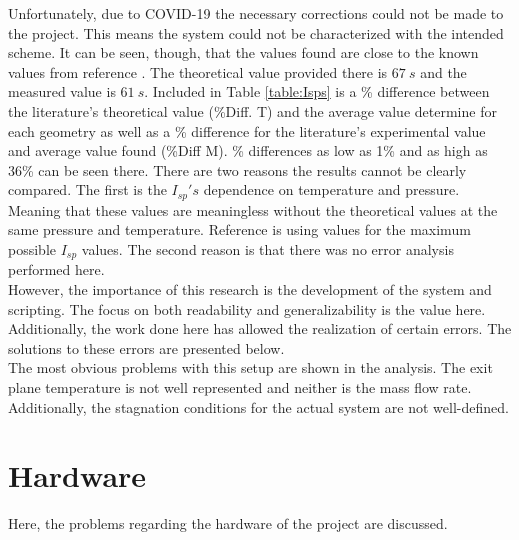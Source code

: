 Unfortunately, due to COVID-19 the necessary corrections could not be made to the project. This means the system could not be characterized with the intended scheme. It can be seen, though, that the values found are close to the known values from reference \cite{anis}. The theoretical value provided there is $67\ s$ and the measured value is $61\ s$. Included in Table \ref{table:Isps} is a \% difference between the literature's theoretical value (\%Diff. T) and the average value determine for each geometry as well as a \% difference for the literature's experimental value and average value found (\%Diff M). \% differences as low as 1\% and as high as 36\% can be seen there. There are two reasons the results cannot be clearly compared. The first is the $I_{sp}'s$ dependence on temperature and pressure. Meaning that these values are meaningless without the theoretical values at the same pressure and temperature. Reference \cite{anis} is using values for the maximum possible $I_{sp}$ values. The second reason is that there was no error analysis performed here.\\
However, the importance of this research is the development of the system and  scripting. The focus on both readability and generalizability is the value here. Additionally, the work done here has allowed the realization of certain errors. The solutions to these errors are presented below.\\
The most obvious problems with this setup are shown in the analysis. The exit plane temperature is not well represented and neither is the mass flow rate. Additionally, the stagnation conditions for the actual system are not well-defined.
\section{Hardware}
Here, the problems regarding the hardware of the project are discussed.
